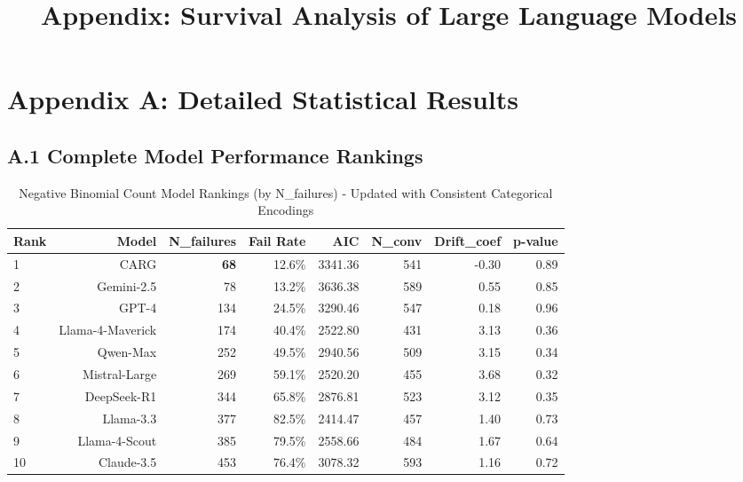 \documentclass[letterpaper]{article}
\title{Appendix: Survival Analysis of Large Language Models}
\begin{document}
\section*{Appendix A: Detailed Statistical Results}
\label{app:detailed_results}

\subsection*{A.1 Complete Model Performance Rankings}

\begin{table}[ht]
\centering
\caption{Negative Binomial Count Model Rankings (by N\_failures) - Updated with Consistent Categorical Encodings}
\label{tab:count_results_detailed}
\begin{tabular}{lrrrrrrr}
\toprule
\textbf{Rank} & \textbf{Model} & \textbf{N\_failures} & \textbf{Fail Rate} & \textbf{AIC} & \textbf{N\_conv} & \textbf{Drift\_coef} & \textbf{p-value} \\
\midrule
1 & CARG & \textbf{68} & 12.6\% & 3341.36 & 541 & -0.30 & 0.89 \\
2 & Gemini-2.5 & 78 & 13.2\% & 3636.38 & 589 & 0.55 & 0.85 \\
3 & GPT-4 & 134 & 24.5\% & 3290.46 & 547 & 0.18 & 0.96 \\
4 & Llama-4-Maverick & 174 & 40.4\% & 2522.80 & 431 & 3.13 & 0.36 \\
5 & Qwen-Max & 252 & 49.5\% & 2940.56 & 509 & 3.15 & 0.34 \\
6 & Mistral-Large & 269 & 59.1\% & 2520.20 & 455 & 3.68 & 0.32 \\
7 & DeepSeek-R1 & 344 & 65.8\% & 2876.81 & 523 & 3.12 & 0.35 \\
8 & Llama-3.3 & 377 & 82.5\% & 2414.47 & 457 & 1.40 & 0.73 \\
9 & Llama-4-Scout & 385 & 79.5\% & 2558.66 & 484 & 1.67 & 0.64 \\
10 & Claude-3.5 & 453 & 76.4\% & 3078.32 & 593 & 1.16 & 0.72 \\
\bottomrule
\end{tabular}
\end{table}
\end{document}
